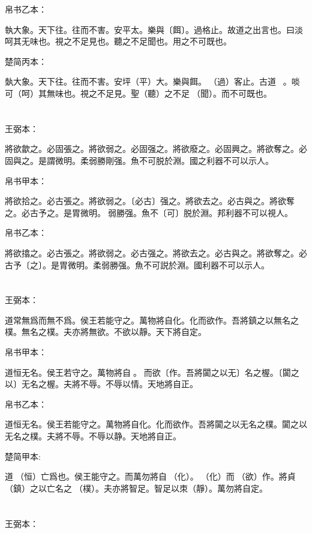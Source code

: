 \documentclass[a5paper]{ctexbook}
\begin{document}
    帛书乙本：

    執大象。天下往。往而不害。安平太。樂與〔餌〕。過格止。故道之出言也。曰淡呵其无味也。視之不足見也。聽之不足聞也。用之不可既也。

    楚简丙本：

    埶大象。天下往。往而不害。安坪（平）大。樂與餌。󶵨（過）客止。古道☐☐☐。啖可（呵）其無味也。視之不足見。聖（聽）之不足𦖞（聞）。而不可既也。

    \chapter{}
    王弼本：

    將欲歙之。必固張之。將欲弱之。必固强之。將欲廢之。必固興之。將欲奪之。必固與之。是謂微明。柔弱勝剛强。魚不可脱於淵。國之利器不可以示人。

    
    帛书甲本：

    將欲拾之。必古張之。將欲弱之。〔必古〕强之。將欲去之。必古與之。將欲奪之。必古予之。是胃微明。󱁩弱勝强。魚不〔可〕脱於淵。邦利器不可以視人。

    帛书乙本：

    將欲㩉之。必古張之。將欲弱之。必古强之。將欲去之。必古與之。將欲奪之。必古予〔之〕。是胃微明。柔弱勝强。魚不可説於淵。國利器不可以示人。

    \chapter{}
    王弼本：

    道常無爲而無不爲。侯王若能守之。萬物將自化。化而欲作。吾將鎮之以無名之樸。無名之樸。夫亦將無欲。不欲以靜。天下將自定。

    
    帛书甲本：

    道恒无名。侯王若守之。萬物將自𢡺。𢡺而欲〔作。吾將闐之以无〕名之楃。〔闐之以〕无名之楃。夫將不辱。不辱以情。天地將自正。

    帛书乙本：

    道恒无名。侯王若能守之。萬物將自化。化而欲作。吾將闐之以无名之樸。闐之以无名之樸。夫將不辱。不辱以静。天地將自正。

    楚简甲本:

    道𠄨（恒）亡爲也。侯王能守之。而萬勿將自𢠿（化）。𢠿（化）而𨿜（欲）作。將貞（鎮）之以亡名之󶴯（樸）。夫亦將智足。智足以朿（靜）。萬勿將自定。

    \chapter{}
    王弼本：
\end{document}
